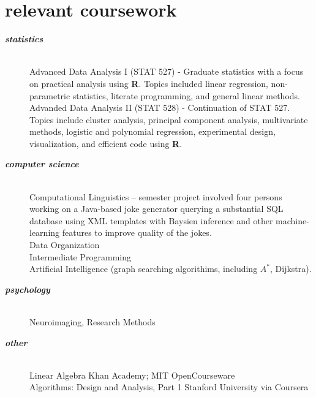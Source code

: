 \documentclass[]{friggeri-cv} %
\begin{document}
\section{relevant coursework}
\begin{description}
   \item[\textbf{\textit{statistics}}] \hfill \\
	 Advanced Data Analysis I (STAT 527) - Graduate statistics with a focus on practical analysis using \textbf{R}. 
	 Topics included linear regression, non-parametric statistics, literate programming, and general linear methods. \hfill  \\
	 Advanded Data Analysis II (STAT 528) - Continuation of STAT 527. 
	 Topics include cluster analysis, principal component analysis, multivariate methods, 
	 logistic and polynomial regression, experimental design, visualization, and efficient code using \textbf{R}.
   \item[\textbf{\textit{computer science}}] \hfill \\
	   Computational Linguistics – semester project involved four persons 
	   working on a Java-based joke generator querying a substantial SQL database using 
	   XML templates with Baysien inference and other machine-learning features to improve quality 
	   of the jokes. \hfill \\
	   Data Organization \hfill \\
	   Intermediate Programming \hfill \\
	   Artificial Intelligence (graph searching algorithims, including $A^*$, Dijkstra). 
   \item[\textbf{\textit{psychology}}] \hfill \\  
	 Neuroimaging, Research Methods 
   \item[\textbf{\textit{other}}] \hfill \\
	 Linear Algebra \textemdash Khan Academy; MIT OpenCourseware \hfill \\
	 Algorithms: Design and Analysis, Part 1 \textemdash Stanford University via Coursera
\end{description}

\end{document}
